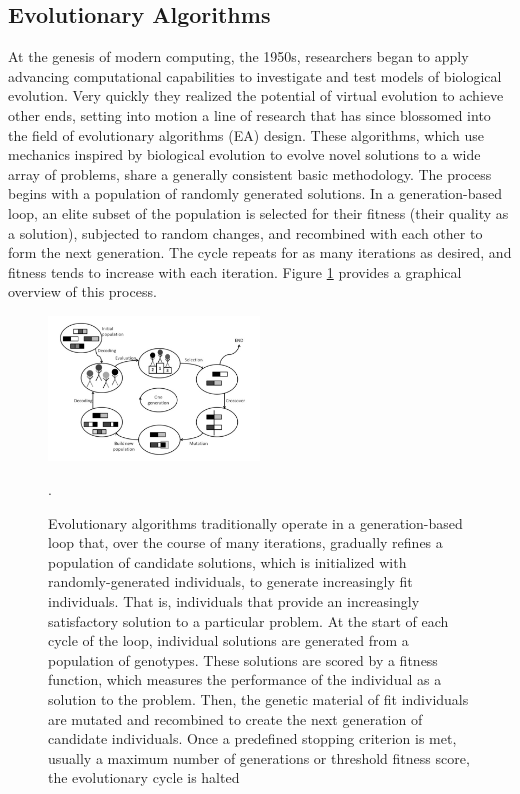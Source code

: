 \documentclass[a4paper]{article}
\begin{document}
\subsection{Evolutionary Algorithms}
At the genesis of modern computing, the 1950s, researchers began to apply advancing computational capabilities to investigate and test models of biological evolution. Very quickly they realized the potential of virtual evolution to achieve other ends, setting into motion a line of research that has since blossomed into the field of evolutionary algorithms (EA) design. These algorithms, which use mechanics inspired by biological evolution to evolve novel solutions to a wide array of problems, share a generally consistent basic methodology. The process begins with a population of randomly generated solutions. In a generation-based loop, an elite subset of the population is selected for their fitness (their quality as a solution), subjected to random changes, and recombined with each other to form the next generation. The cycle repeats for as many iterations as desired, and fitness tends to increase with each iteration. Figure \ref{fig:working_principle} provides a graphical overview of this process.
\begin{figure}
\centering
\includegraphics[width=0.5\textwidth]{working_principle_of_EA.jpg}
\caption{\label{fig:working_principle} Evolutionary algorithms traditionally operate in a generation-based loop that, over the course of many iterations, gradually refines a population of candidate solutions, which is initialized with randomly-generated individuals, to generate increasingly fit individuals. That is, individuals that provide an increasingly satisfactory solution to a particular problem. At the start of each cycle of the loop, individual solutions are generated from a population of genotypes. These solutions are scored by a fitness function, which measures the performance of the individual as a solution to the problem. Then, the genetic material of fit individuals are mutated and recombined to create the next generation of candidate individuals. Once a predefined stopping criterion is met, usually a maximum number of generations or threshold fitness score, the evolutionary cycle is halted \cite{Prothmann2009EvolutionaryOptimisation}}.
\end{figure}
\end{document}
